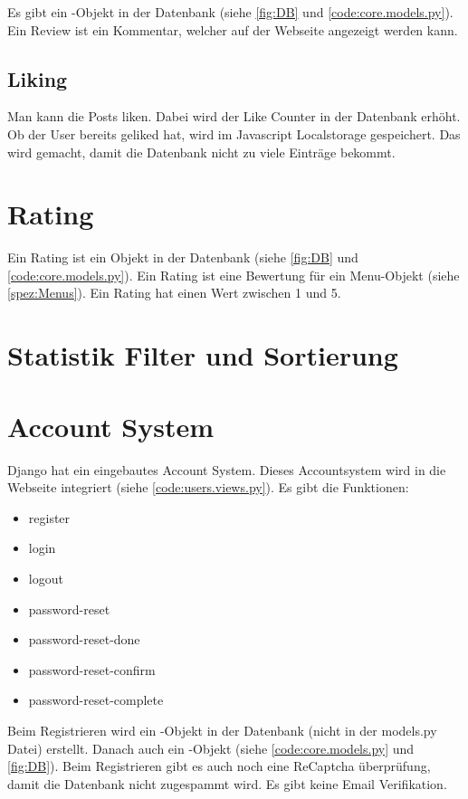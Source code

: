 Es gibt ein -Objekt in der Datenbank (siehe \ref{fig:DB} und
\ref{code:core.models.py}). Ein Review ist ein Kommentar, welcher auf der
Webseite angezeigt werden kann.

\subsection{Liking} \label{spez:Liking}

Man kann die Posts liken. Dabei wird der Like Counter in der Datenbank erhöht.
Ob der User bereits geliked hat, wird im Javascript Localstorage gespeichert.
Das wird gemacht, damit die Datenbank nicht zu viele Einträge bekommt.

\section{Rating} \label{spez:Rating}

Ein Rating ist ein Objekt in der Datenbank (siehe \ref{fig:DB} und
\ref{code:core.models.py}). Ein Rating ist eine Bewertung für ein Menu-Objekt
(siehe \ref{spez:Menus}). Ein Rating hat einen Wert zwischen 1 und 5.

\section{Statistik Filter und Sortierung} \label{spez:Statistik}



\section{Account System} \label{spez:Account}

Django hat ein eingebautes Account System. Dieses Accountsystem wird in die
Webseite integriert (siehe \ref{code:users.views.py}). Es gibt die Funktionen:
\begin{itemize}
    \item register
    \item login
    \item logout
    \item password-reset
    \item password-reset-done
    \item password-reset-confirm
    \item password-reset-complete
\end{itemize}

Beim Registrieren wird ein -Objekt in der Datenbank (nicht in der
models.py Datei) erstellt. Danach auch ein -Objekt (siehe
\ref{code:core.models.py} und \ref{fig:DB}). Beim Registrieren gibt es auch noch
eine ReCaptcha überprüfung, damit die Datenbank nicht zugespammt wird. Es gibt
keine Email Verifikation.

